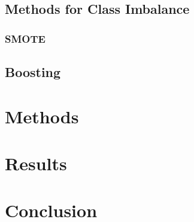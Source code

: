 \documentclass[10pt]{article}
\begin{document}




\subsection{Methods for Class Imbalance}

\subsubsection{SMOTE}

\subsection{Boosting}

\section{Methods}

\section{Results}

\section{Conclusion}


\newpage 



\end{document}
